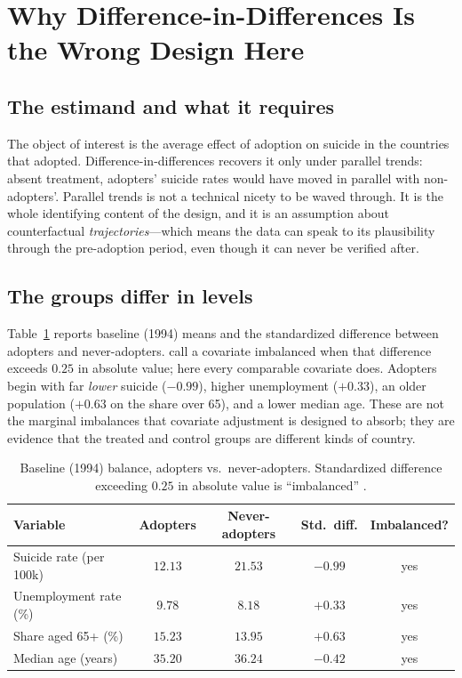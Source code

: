 \documentclass[12pt]{article}
\begin{document}
\section{Why Difference-in-Differences Is the Wrong Design Here}
\label{sec:did}

\subsection{The estimand and what it requires}

The object of interest is the average effect of adoption on suicide in the countries that adopted.
Difference-in-differences recovers it only under parallel trends: absent treatment, adopters' suicide
rates would have moved in parallel with non-adopters'. Parallel trends is not a technical nicety to
be waved through. It is the whole identifying content of the design, and it is an assumption about
counterfactual \emph{trajectories}---which means the data can speak to its plausibility through the
pre-adoption period, even though it can never be verified after.

\subsection{The groups differ in levels}

Table~\ref{tab:balance} reports baseline (1994) means and the standardized difference between
adopters and never-adopters. \citet{imbens2015causal} call a covariate imbalanced when that
difference exceeds $0.25$ in absolute value; here every comparable covariate does. Adopters begin
with far \emph{lower} suicide ($-0.99$), higher unemployment ($+0.33$), an older population
($+0.63$ on the share over 65), and a lower median age. These are not the marginal imbalances that
covariate adjustment is designed to absorb; they are evidence that the treated and control groups are
different kinds of country.

\begin{table}[h]
\centering\small
\caption{Baseline (1994) balance, adopters vs.\ never-adopters. Standardized difference exceeding
$0.25$ in absolute value is ``imbalanced'' \citep{imbens2015causal}.}
\label{tab:balance}
\begin{tabular}{lcccc}
\toprule
Variable & Adopters & Never-adopters & Std.\ diff. & Imbalanced? \\
\midrule
Suicide rate (per 100k) & $12.13$ & $21.53$ & $-0.99$ & yes \\
Unemployment rate (\%) & $9.78$ & $8.18$ & $+0.33$ & yes \\
Share aged 65+ (\%) & $15.23$ & $13.95$ & $+0.63$ & yes \\
Median age (years) & $35.20$ & $36.24$ & $-0.42$ & yes \\
\bottomrule
\end{tabular}
\end{table}
\end{document}
